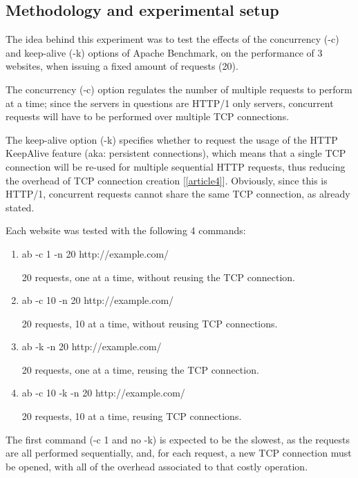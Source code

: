\documentclass[a4paper,10pt]{article}
\begin{document}
\subsection{Methodology and experimental setup}

The idea behind this experiment was to test the effects of the concurrency (-c) and keep-alive (-k) options of Apache Benchmark, on the performance of 3 websites, when issuing a fixed amount of requests (20). 

The concurrency (-c) option regulates the number of multiple requests to perform at a time; since the servers in questions are HTTP/1 only servers, concurrent requests will have to be performed over multiple TCP connections. 

The keep-alive option (-k) specifies whether to request the usage of the HTTP KeepAlive feature (aka: persistent connections), which means that a single TCP connection will be re-used for multiple sequential HTTP requests, thus reducing the overhead of TCP connection creation [\ref{article4}]. Obviously, since this is HTTP/1, concurrent requests cannot share the same TCP connection, as already stated.


Each website was tested with the following 4 commands:


\begin{enumerate}


\item ab -c 1 -n 20 http://example.com/

20 requests, one at a time, without reusing the TCP connection.

\item ab -c 10 -n 20 http://example.com/

20 requests, 10 at a time, without reusing TCP connections.

\item ab -k -n 20 http://example.com/

20 requests, one at a time, reusing the TCP connection.


\item ab -c 10 -k -n 20 http://example.com/

20 requests, 10 at a time, reusing TCP connections.


\end{enumerate}



The first command (-c 1 and no -k) is expected to be the slowest, as the requests are all performed sequentially, and, for each request, a new TCP connection must be opened, with all of the overhead associated to that costly operation. 
\end{document}

